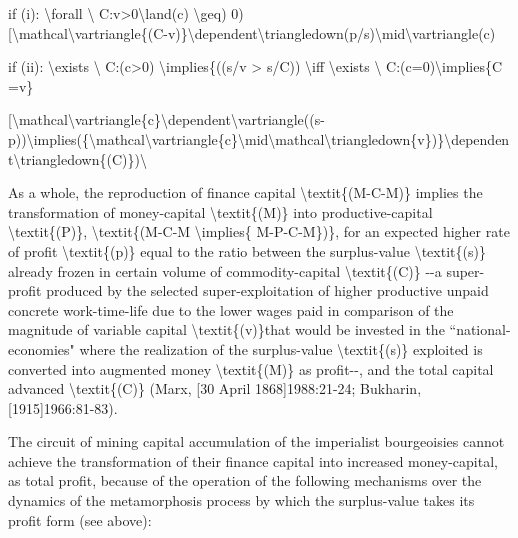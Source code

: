 \documentclass[
]{article}
\begin{document}
if (i): \textbackslash forall \textbackslash{}
C:v\textgreater0\textbackslash land(c) \textbackslash geq) 0)\\
{[}\textbackslash mathcal\textbackslash vartriangle\{(C-v)\}\textbackslash dependent\textbackslash triangledown(p\textquotesingle/s\textquotesingle)\textbackslash mid\textbackslash vartriangle(c)

if (ii): \textbackslash exists \textbackslash{} C:(c\textgreater0)
\textbackslash implies\{((s/v \textgreater{} s/C)) \textbackslash iff
\textbackslash exists \textbackslash{} C:(c=0)\textbackslash implies\{C
=v\}

{[}\textbackslash mathcal\textbackslash vartriangle\{c\}\textbackslash dependent\textbackslash vartriangle((s\textquotesingle-p\textquotesingle))\textbackslash implies(\{\textbackslash mathcal\textbackslash vartriangle\{c\}\textbackslash mid\textbackslash mathcal\textbackslash triangledown\{v\})\}\textbackslash dependent\textbackslash triangledown\{(C)\})\textbackslash{}

As a whole, the reproduction of finance capital
\textbackslash textit\{(M-C-M\textquotesingle)\} implies the
transformation of money-capital \textbackslash textit\{(M)\} into
productive-capital \textbackslash textit\{(P)\},
\textbackslash textit\{(M-C-M\textquotesingle{} \textbackslash implies\{
M-P-C-M\textquotesingle\})\}, for an expected higher rate of profit
\textbackslash textit\{(p\textquotesingle)\} equal to the ratio between
the surplus-value \textbackslash textit\{(s)\} already frozen in certain
volume of commodity-capital \textbackslash textit\{(C)\} -\/-a
super-profit produced by the selected super-exploitation of higher
productive unpaid concrete work-time-life due to the lower wages paid in
comparison of the magnitude of variable capital
\textbackslash textit\{(v)\}that would be invested in the
``national-economies" where the realization of the surplus-value
\textbackslash textit\{(s)\} exploited is converted into augmented money
\textbackslash textit\{(M\textquotesingle)\} as profit-\/-, and the
total capital advanced \textbackslash textit\{(C)\} (Marx, {[}30 April
1868{]}1988:21-24; Bukharin, {[}1915{]}1966:81-83).

The circuit of mining capital accumulation of the imperialist
bourgeoisies cannot achieve the transformation of their finance capital
into increased money-capital, as total profit, because of the operation
of the following mechanisms over the dynamics of the metamorphosis
process by which the surplus-value takes its profit form (see above):
\end{document}
